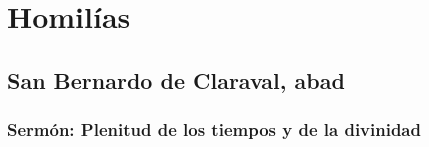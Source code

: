 \newsection		

\section{Homilías}
\homiliasNavidad


\subsection{San Bernardo de Claraval, abad}

\subsubsection{Sermón: Plenitud de los tiempos y de la divinidad}


